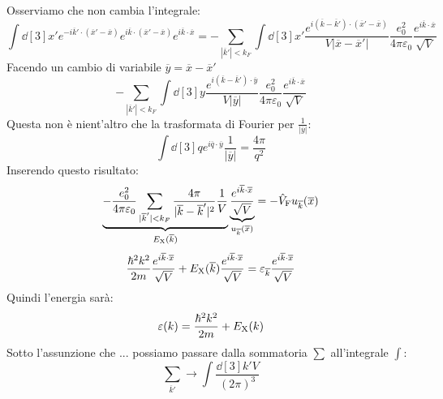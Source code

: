 Osserviamo che non cambia l'integrale:
\begin{equation*}
    \int \dd[3]{x'}e^{-i\overline{k}'\cdot(\overline{x}'-\overline{x})}e^{i\overline{k}\cdot(\overline{x}'-\overline{x})}e^{i\overline{k}\cdot\overline{x}} = -\sum_{|\overline{k}'|<k_F}\int \dd[3]{x'}\frac{e^{i(\overline{k}-\overline{k}')\cdot(\overline{x}'-\overline{x})}}{V|\overline{x}-\overline{x}'|}\frac{e_0^2}{4\pi\varepsilon_0}\frac{e^{i\overline{k}\cdot\overline{x}}}{\sqrt V}
\end{equation*}
Facendo un cambio di variabile $\overline{y}=\overline{x}-\overline{x}'$
\begin{equation*}
    -\sum_{|\overline{k}'|<k_F}\int\dd[3]{y}\frac{e^{i(\overline k -\overline k')\cdot\overline y}}{V|\overline y|}\frac{e_0^2}{4\pi\varepsilon_0}\frac{e^{i\overline k \cdot \overline x}}{\sqrt V}
\end{equation*}
Questa non è nient'altro che la trasformata di Fourier per $\frac{1}{|\overline y|}$:
\begin{equation*}
    \int \dd[3]{q}e^{i\overline q \cdot \overline y}\frac{1}{|\overline y|}=\frac{4\pi}{q^2}
\end{equation*}
Inserendo questo risultato:
\begin{equation*}
    \underbrace{-\frac{e_0^2}{4\pi\varepsilon_0}\sum_{|\overline{k}'|<k_F}\frac{4\pi}{|\overline k - \overline k '|^2}\frac{1}{V}}_{E_\text{X}(\overline k)}\underbrace{\frac{e^{i\overline k \cdot \overline x}}{\sqrt V}}_{u_{\overline k}(\overline x)}=-\hat V_{\text F}u_{\overline k}(\overline x)
\end{equation*}
\begin{equation*}
    \frac{\hbar^2k^2}{2m}\frac{e^{i\overline k \cdot \overline x}}{\sqrt V}+E_{\text X}(\overline k)\frac{e^{i\overline k \cdot \overline x}}{\sqrt V}=\varepsilon_{\overline k}\frac{e^{i\overline k \cdot \overline x}}{\sqrt V}
\end{equation*}
Quindi l'energia sarà:
\begin{equation*}
    \varepsilon(k)=\frac{\hbar^2k^2}{2m}+E_{\text X}(k)
\end{equation*}
Sotto l'assunzione che ... possiamo passare dalla sommatoria $\sum$ all'integrale $\int$:
\begin{equation*}
    \sum_{\overline k'} \rightarrow \int \frac{\dd[3]{k'}V}{(2\pi)^3}
\end{equation*}
